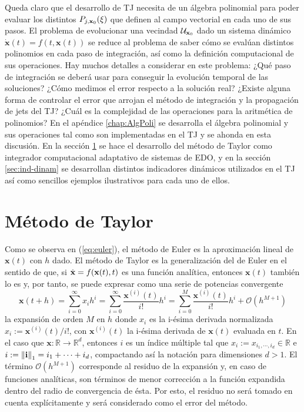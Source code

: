 Queda claro que el desarrollo de TJ necesita de un álgebra polinomial para poder evaluar los distintos $P_{j,\mathbf{x}_0}(\xi)$ que definen al campo vectorial en cada uno de sus pasos. El problema de evolucionar una vecindad $\mathcal{U}_{\mathbf{x}_0}$ dado un sistema dinámico $\dot{\mathbf{x}}(t) = f(t,\mathbf{x}(t))$ se reduce al problema de saber cómo se evalúan distintos polinomios en cada paso de integración, así como la definición computacional de sus operaciones. Hay muchos detalles a considerar en este problema: ¿Qué paso de integración se deberá usar para conseguir la evolución temporal de las soluciones? ¿Cómo medimos el error respecto a la solución real? ¿Existe alguna forma de controlar el error que arrojan el método de integración y la propagación de jets del TJ? ¿Cuál es la complejidad de las operaciones para la aritmética de polinomios? En el apéndice \ref{chap:AlgPoli} se desarrolla el álgebra polinomial y sus operaciones tal como son implementadas en el TJ y se ahonda en esta discusión. En la sección \ref{sec:taylor-metodo} se hace el desarrollo del método de Taylor como integrador computacional adaptativo de sistemas de EDO, y en la sección \ref{sec:ind-dinam} se desarrollan distintos indicadores dinámicos utilizados en el TJ así como sencillos ejemplos ilustrativos para cada uno de ellos.

\section{Método de Taylor}
\label{sec:taylor-metodo}

Como se observa en (\ref{eq:euler}), el método de Euler es la aproximación lineal de $\mathbf{x}(t)$ con $h$ dado. El método de Taylor es la generalización del de Euler en el sentido de que, si $\dot{\mathbf{x}} = f(\mathbf{x}(t),t)$ es una función analítica, entonces $\mathbf{x}(t)$ también lo es y, por tanto, se puede expresar como una serie de potencias convergente 
\begin{equation}
\mathbf{x}(t + h) = \sum_{i=0}^\infty x_i h^i = \sum_{i=0}^\infty \frac{\mathbf{x}^{(i)}(t)}{i!}h^i 
= \sum_{i=0}^M \frac{\mathbf{x}^{(i)}(t)}{i!}h^i + \mathcal{O}(h^{M+1})
\label{eq:anal-exp}
\end{equation}
la expansión de orden $M$ en $h$ donde $x_i$ es la i-ésima derivada normalizada $x_i  := \mathbf{x}^{(i)}(t)/i! $, con $\mathbf{x}^{(i)}(t)$ la i-ésima derivada de $\mathbf{x}(t)$ evaluada en $t$. En el caso que $\mathbf{x}: \mathbb{R} \to \mathbb{R}^d$, entonces $i$ es un índice múltiple tal que $x_i := x_{i_1,\cdots,i_d} \in \mathbb{R}$ e $i :=\left\lVert\mathbf{i}\right\rVert_1 = i_1 + \cdots + i_d$, compactando así la notación para dimensiones $d > 1$. El término $\mathcal{O}(h^{M+1})$ corresponde al residuo de la expansión y, en caso de funciones analíticas, son términos de menor corrección a la función expandida dentro del radio de convergencia de ésta. Por esto, el residuo no será tomado en cuenta explícitamente y será considerado como el error del método.


